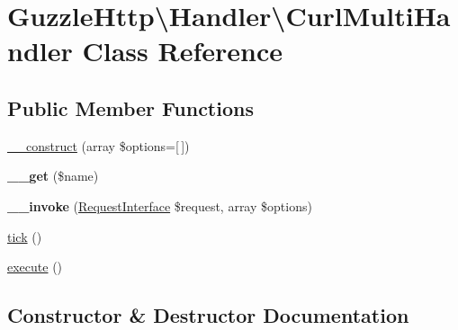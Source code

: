 \hypertarget{classGuzzleHttp_1_1Handler_1_1CurlMultiHandler}{}\section{Guzzle\+Http\textbackslash{}Handler\textbackslash{}Curl\+Multi\+Handler Class Reference}
\label{classGuzzleHttp_1_1Handler_1_1CurlMultiHandler}
\subsection*{Public Member Functions}
\begin{DoxyCompactItemize}
\item 
\hyperlink{classGuzzleHttp_1_1Handler_1_1CurlMultiHandler_a7760c090b147a8127fdafc5e64f484ba}{\+\_\+\+\_\+construct} (array \$options=\mbox{[}$\,$\mbox{]})
\item 
\mbox{\label{classGuzzleHttp_1_1Handler_1_1CurlMultiHandler_a699b1e9c3b426af88fc7e0da3e5d3b81}} 
{\bfseries \+\_\+\+\_\+get} (\$name)
\item 
\mbox{\label{classGuzzleHttp_1_1Handler_1_1CurlMultiHandler_ad73bec484f40d2e411d370e36fd45aa0}} 
{\bfseries \+\_\+\+\_\+invoke} (\hyperlink{interfacePsr_1_1Http_1_1Message_1_1RequestInterface}{Request\+Interface} \$request, array \$options)
\item 
\hyperlink{classGuzzleHttp_1_1Handler_1_1CurlMultiHandler_a0b90b8c277957da0258c1b3cb539b3a7}{tick} ()
\item 
\hyperlink{classGuzzleHttp_1_1Handler_1_1CurlMultiHandler_afb724c45e653474792ff7744fc257c7f}{execute} ()
\end{DoxyCompactItemize}


\subsection{Constructor \& Destructor Documentation}
\mbox{\label{classGuzzleHttp_1_1Handler_1_1CurlMultiHandler_a7760c090b147a8127fdafc5e64f484ba}} 

